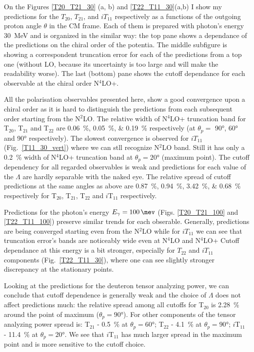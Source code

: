     On the Figures \ref{T20_T21_30} (a, b) and \ref{T22_T11_30}(a,b)
    I show my predictions for the
    $T_{20}$, $T_{21}$,  and $iT_{11}$ respectively as a functions 
    of the outgoing proton angle $\theta$ in the CM frame. Each of them
    is prepared with photon's energy 30~MeV and is
    organized in the similar way: the top
    pane shows a dependance of the predictions on the 
    chiral order of the potentia. The middle subfigure is
    showing a correspondent truncation error for each of the 
    predictions from a top one (without LO, because its uncertainty is
    too large and will make the readability worse). The last (bottom)
    pane shows the cutoff dependance for each observable at the chiral
    order N$^4$LO+. 

    All the polarisation observables presented here, show a good convergence 
    upon a chiral order as it is hard to distinguish the predictions
    from each subsequent order starting from the N$^2$LO.
    The relative width of N$^4$LO+ truncation band 
    for T$_{20}$, T$_{21}$ and T$_{22}$
    are \SIlist{0.06; 0.05; 0.19}{\percent} respectively (at $\theta_p=$ \ang{90}, \ang{60} and \ang{90} respectively).
    The slowest convergence is observed for $iT_{11}$ (Fig.~\ref{T11_30_vert})
    where we can stll recognize N$^2$LO band.
    Still it has only a \SI{0.2}{\percent}
    width of N$^4$LO+ truncation band at $\theta_p = \ang{20}$ (maximum point).
    The cutoff dependency for all regarded observables is weak and 
    predictions for each value of the $\Lambda$ are hardly separable 
    with the naked eye.
    The relative spread of cutoff predictions at the same angles as above 
    are \SIlist{0.87; 0.94; 3.42; 0.68}{\percent} respectively for T$_{20}$, T$_{21}$, T$_{22}$ and $i\text{T}_{11}$ respectively.


    Predictions for the photon's energy $E_\gamma = \SI{100}{\mev}$
    (Figs. \ref{T20_T21_100} and \ref{T22_T11_100}) preserve similar
    trends for each obserable. 
    Generally, predictions are being converged starting
    even from the N$^2$LO while for $iT_{11}$
    we can see 
    that truncation error's bands are noticeably wide
    even at N$^4$LO and N$^4$LO+
    Cutoff dependance at this energy is a bit stronger, especially
    for 
    $T_{22}$ and $iT_{11}$ components (Fig.~\ref{T22_T11_30}),
    where one can see 
    slightly stronger discrepancy at the stationary points.
    
    Looking at the predictions for the deuteron tensor analyzing power,
    we can conclude that cutoff dependence is generally weak
    and the choice of $\Lambda$ does not affect predictions much:
    the relative spread among all cutoffs for T$_{20}$ is \SI{2.28}{\percent}
    around the point of maximum ($\theta_p = \ang{90}$).
    For other components of the tensor analyzing power spread is:
    T$_{21}$ - \SI{0.5}{\percent} at $\theta_p = \ang{60}$;
    T$_{22}$ - \SI{4.1}{\percent} at $\theta_p = \ang{90}$;
    $i$T$_{11}$ - \SI{11.4}{\percent} at $\theta_p = \ang{20}$. We see that $i$T$_{11}$ has much larger spread in the maximum point and is more sensitive to the cutoff choice.

